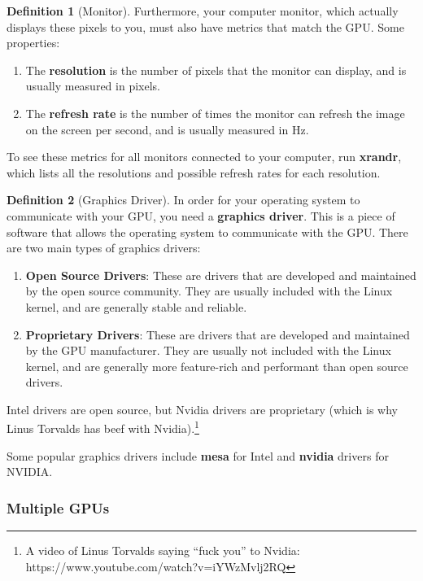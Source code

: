 \documentclass{article}
\theoremstyle{definition}
\newtheorem{definition}{Definition}[section]
\begin{document}
    \begin{definition}[Monitor]
      Furthermore, your computer monitor, which actually displays these pixels to you, must also have metrics that match the GPU. Some properties: 
      \begin{enumerate} 
        \item The \textbf{resolution} is the number of pixels that the monitor can display, and is usually measured in pixels. 
        \item The \textbf{refresh rate} is the number of times the monitor can refresh the image on the screen per second, and is usually measured in Hz. 
      \end{enumerate}
      To see these metrics for all monitors connected to your computer, run \textbf{xrandr}, which lists all the resolutions and possible refresh rates for each resolution. 
    \end{definition}

    \begin{definition}[Graphics Driver]
      In order for your operating system to communicate with your GPU, you need a \textbf{graphics driver}. This is a piece of software that allows the operating system to communicate with the GPU. There are two main types of graphics drivers:
      \begin{enumerate} 
        \item \textbf{Open Source Drivers}: These are drivers that are developed and maintained by the open source community. They are usually included with the Linux kernel, and are generally stable and reliable. 
        \item \textbf{Proprietary Drivers}: These are drivers that are developed and maintained by the GPU manufacturer. They are usually not included with the Linux kernel, and are generally more feature-rich and performant than open source drivers. 
      \end{enumerate}
    Intel drivers are open source, but Nvidia drivers are proprietary (which is why Linus Torvalds has beef with Nvidia).\footnote{A video of Linus Torvalds saying ``fuck you'' to Nvidia: https://www.youtube.com/watch?v=iYWzMvlj2RQ}
    \end{definition}

    Some popular graphics drivers include \textbf{mesa} for Intel and \textbf{nvidia} drivers for NVIDIA. 

    \subsubsection{Multiple GPUs} 
\end{document}

